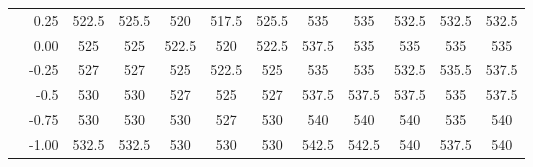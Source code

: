 \begin{tabular}{l | r | ccccc || ccccc}
    & 0.25  & \cellcolor{white!52!gray}522.5  & \cellcolor{white!36!gray}525.5  & \cellcolor{white!60!gray}520    & \cellcolor{white!68!gray}517.5  & \cellcolor{white!36!gray}525.5  & \cellcolor{white!45!orange}535    & \cellcolor{white!45!orange}535    & \cellcolor{white!56!orange}532.5  & \cellcolor{white!56!orange}532.5  & \cellcolor{white!56!orange}532.5  \\
    & 0.00  & \cellcolor{white!44!gray}525    & \cellcolor{white!44!gray}525    & \cellcolor{white!52!gray}522.5  & \cellcolor{white!60!gray}520    & \cellcolor{white!52!gray}522.5  & \cellcolor{white!23!orange}537.5  & \cellcolor{white!45!orange}535    & \cellcolor{white!45!orange}535    & \cellcolor{white!45!orange}535    & \cellcolor{white!45!orange}535    \\
    & -0.25 & \cellcolor{white!28!gray}527    & \cellcolor{white!20!gray}527    & \cellcolor{white!44!gray}525    & \cellcolor{white!52!gray}522.5  & \cellcolor{white!44!gray}525    & \cellcolor{white!45!orange}535    & \cellcolor{white!45!orange}535    & \cellcolor{white!56!orange}532.5  & \cellcolor{white!34!orange}535.5  & \cellcolor{white!23!orange}537.5  \\
    & -0.5  & \cellcolor{white!12!gray}530    & \cellcolor{white!12!gray}530    & \cellcolor{white!20!gray}527    & \cellcolor{white!44!gray}525    & \cellcolor{white!20!gray}527    & \cellcolor{white!23!orange}537.5  & \cellcolor{white!23!orange}537.5  & \cellcolor{white!23!orange}537.5  & \cellcolor{white!45!orange}535    & \cellcolor{white!23!orange}537.5  \\
    & -0.75 & \cellcolor{white!12!gray}530    & \cellcolor{white!12!gray}530    & \cellcolor{white!12!gray}530    & \cellcolor{white!20!gray}527    & \cellcolor{white!12!gray}530    & \cellcolor{white!12!orange}540    & \cellcolor{white!12!orange}540    & \cellcolor{white!12!orange}540    & \cellcolor{white!45!orange}535    & \cellcolor{white!12!orange}540    \\
    & -1.00 & \cellcolor{white!8!gray}532.5   & \cellcolor{white!8!gray}532.5   & \cellcolor{white!12!gray}530    & \cellcolor{white!12!gray}530    & \cellcolor{white!12!gray}530    & \cellcolor{white!1!orange}542.5   & \cellcolor{white!1!orange}542.5   & \cellcolor{white!12!orange}540    & \cellcolor{white!23!orange}537.5  & \cellcolor{white!12!orange}540    \\
\hline\hline
\end{tabular}

